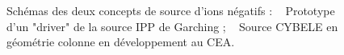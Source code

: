 \begin{refsection}
\begin{figure}[!hbtp]
 \caption{Schémas des deux concepts de source d'ions négatifs :
    ~ Prototype d'un "driver" de la source IPP de Garching
    ; ~ Source CYBELE en géométrie colonne en
    développement au CEA. } 
 \end{figure}


\end{refsection}
